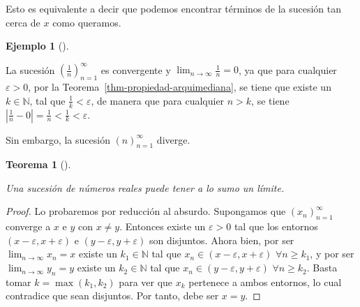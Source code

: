 \documentclass[
  a4paper,
]{scrreport}
\theoremstyle{definition}
\newtheorem{example}{Ejemplo}[chapter]
\theoremstyle{plain}
\theoremstyle{definition}
\theoremstyle{plain}
\newtheorem{theorem}{Teorema}[chapter]
\theoremstyle{plain}
\theoremstyle{remark}
\begin{document}
Esto es equivalente a decir que podemos encontrar términos de la
sucesión tan cerca de \(x\) como queramos.

\leavevmode{}%
\begin{example}[]\label{exm-limite-sucesion}

La sucesión \((\frac{1}{n})_{n=1}^\infty\) es convergente y
\(\lim_{n\to\infty}\frac{1}{n} = 0\), ya que para cualquier
\(\varepsilon>0\), por la Teorema~\ref{thm-propiedad-arquimediana}, se
tiene que existe un \(k\in\mathbb{N}\), tal que
\(\frac{1}{k}<\varepsilon\), de manera que para cualquier \(n>k\), se
tiene \(|\frac{1}{n}-0| = \frac{1}{n} <\frac{1}{k}<\varepsilon\).

Sin embargo, la sucesión \((n)_{n=1}^\infty\) diverge.

\end{example}

\leavevmode{}%
\begin{theorem}[]\label{thm-unicidad-limite-sucesion}

Una sucesión de números reales puede tener a lo sumo un límite.

\end{theorem}

\begin{tcolorbox}[enhanced jigsaw, breakable, arc=.35mm, colbacktitle=quarto-callout-note-color!10!white, toptitle=1mm, opacityback=0, colframe=quarto-callout-note-color-frame, colback=white, left=2mm, bottomrule=.15mm, opacitybacktitle=0.6, title=\textcolor{quarto-callout-note-color}{\faInfo}\hspace{0.5em}{Demostración}, toprule=.15mm, titlerule=0mm, coltitle=black, rightrule=.15mm, bottomtitle=1mm, leftrule=.75mm]

\begin{proof}

Lo probaremos por reducción al absurdo. Supongamos que
\((x_n)_{n=1}^\infty\) converge a \(x\) e \(y\) con \(x\neq y\).
Entonces existe un \(\varepsilon>0\) tal que los entornos
\((x-\varepsilon,x+\varepsilon)\) e \((y-\varepsilon,y+\varepsilon)\)
son disjuntos. Ahora bien, por ser \(\lim_{n\to\infty}x_n = x\) existe
un \(k_1\in\mathbb{N}\) tal que \(x_n\in(x-\varepsilon,x+\varepsilon)\)
\(\forall n\geq k_1\), y por ser \(\lim_{n\to\infty}y_n = y\) existe un
\(k_2\in\mathbb{N}\) tal que \(x_n\in(y-\varepsilon,y+\varepsilon)\)
\(\forall n\geq k_2\). Basta tomar \(k=\max(k_1,k_2)\) para ver que
\(x_k\) pertenece a ambos entornos, lo cual contradice que sean
disjuntos. Por tanto, debe ser \(x=y\).

\end{proof}

\end{tcolorbox}
\end{document}
